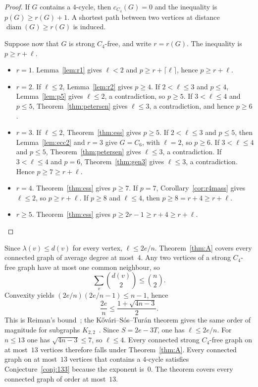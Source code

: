 \documentclass[ASNA]{USG}
\theoremstyle{WBstyletwo}
\numberwithin{equation}{section}
\newcommand{\lr}{\ell}
\newcommand{\pp}{p}
\begin{document}
\begin{proof}
If $G$ contains a $4$-cycle, then $c_{C_4}(G)=0$ and the inequality is $\pp(G)\ge r(G)+1$. A shortest path between two vertices at distance $\operatorname{diam}(G)\ge r(G)$ is induced.

Suppose now that $G$ is strong $C_4$-free, and write $r=r(G)$. The inequality is $\pp\ge r+\lr$.
\begin{itemize}
\item $r=1$. Lemma~\ref{lem:r1} gives $\lr<2$ and $\pp\ge r+\lceil\lr\rceil$, hence $\pp\ge r+\lr$.
\item $r=2$. If $\lr\le 2$, Lemma~\ref{lem:r2} gives $\pp\ge 4$. If $2<\lr\le 3$ and $\pp\le 4$, Lemma~\ref{lem:p5} gives $\lr\le 2$, a contradiction, so $\pp\ge 5$. If $3<\lr\le 4$ and $\pp\le 5$, Theorem~\ref{thm:petersen} gives $\lr\le 3$, a contradiction, and hence $\pp\ge 6$.
\item $r=3$. If $\lr\le 2$, Theorem~\ref{thm:ess} gives $\pp\ge 5$. If $2<\lr\le 3$ and $\pp\le 5$, then Lemma~\ref{lem:ecc2} and $r=3$ give $G=C_6$, with $\lr=2$, so $\pp\ge 6$. If $3<\lr\le 4$ and $\pp\le 5$, Theorem~\ref{thm:petersen} gives $\lr\le 3$, a contradiction. If $3<\lr\le 4$ and $\pp=6$, Theorem~\ref{thm:gen3} gives $\lr\le 3$, a contradiction. Hence $\pp\ge 7\ge r+\lr$.
\item $r=4$. Theorem~\ref{thm:ess} gives $\pp\ge 7$. If $\pp=7$, Corollary~\ref{cor:r4mass} gives $\lr\le 2$, so $\pp\ge r+\lr$. If $\pp\ge 8$ and $\lr\le 4$, then $\pp\ge 8=r+4\ge r+\lr$.
\item $r\ge 5$. Theorem~\ref{thm:ess} gives $\pp\ge 2r-1\ge r+4\ge r+\lr$.
\end{itemize}

\end{proof}

Since $\lambda(v)\le d(v)$ for every vertex, $\lr\le 2e/n$. Theorem~\ref{thm:A} covers every connected graph of average degree at most~$4$. Any two vertices of a strong $C_4$-free graph have at most one common neighbour, so
\[
\sum_v\binom{d(v)}{2}\le\binom{n}{2}.
\]
Convexity yields $(2e/n)(2e/n-1)\le n-1$, hence
\[
\frac{2e}{n}\le\frac{1+\sqrt{4n-3}}{2}.
\]
This is Reiman's bound~\cite{reiman}; the K\H{o}v\'ari--S\'os--Tur\'an theorem gives the same order of magnitude for subgraphs $K_{2,2}$~\cite{kst}. Since $S=2e-3T$, one has $\lr\le 2e/n$. For $n\le 13$ one has $\sqrt{4n-3}\le 7$, so $\lr\le 4$. Every connected strong $C_4$-free graph on at most~$13$ vertices therefore falls under Theorem~\ref{thm:A}. Every connected graph on at most~$13$ vertices that contains a $4$-cycle satisfies Conjecture~\ref{conj:133} because the exponent is~$0$. The theorem covers every connected graph of order at most~$13$.
\end{document}
